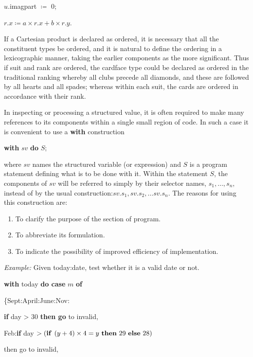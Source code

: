 \quad $u$.imagpart $\coloneq$ 0;

\quad $r.x \coloneq a\times r.x + b\times r.y$.

If a Cartesian product is declared as ordered, it is necessary that all the constituent types be ordered, and it is natural to define the ordering in a lexicographic manner, taking the earlier components as the more significant. Thus if suit and rank are ordered, the cardface type could be declared as ordered in the traditional ranking whereby all clubs precede all diamonds, and these are followed by all hearts and all spades; whereas within each suit, the cards are ordered in accordance with their rank.

In inspecting or processing a structured value, it is often required to make many references to its components within a single small region of code. In such a case it is convenient to use a \textbf{with} construction

\quad \textbf{with} $sv$ \textbf{do} $S$;

\noindent
where $sv$ names the structured variable (or expression) and $S$ is a program statement defining what is to be done with it. Within the statement $S$, the components of $sv$ will be referred to simply by their selector names, $s_1, \dots, s_n,$ instead of by the usual construction:$sv.s_1, sv.s_2, \dots sv.s_n$. The reasons for using this construction are:

\begin{enumerate}[leftmargin=2\parindent, label=(\arabic*)]
	\item To clarify the purpose of the section of program.
	\item To abbreviate its formulation.
	\item To indicate the possibility of improved efficiency of implementation.
\end{enumerate}

\noindent
\textit{Example:} Given today:date, test whether it is a valid date or not.

\quad \textbf{with} today \textbf{do case} $m$ \textbf{of}

\quad \quad \{Sept:April:June:Nov:

\quad \quad \quad \textbf{if} day > 30 \textbf{then go} to invalid,

\quad \quad \quad Feb:\textbf{if} day $> (\text{\textbf{if }} (y + 4) \times 4 = y \text{ \textbf{then} } 29 \text{ \textbf{else} } 28)$

\quad \quad \quad \quad then go to invalid,

